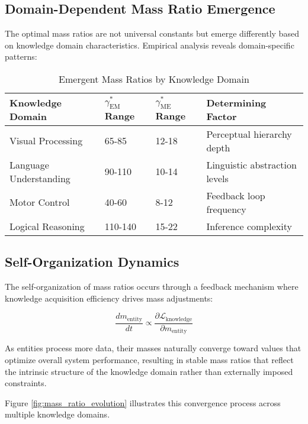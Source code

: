 \subsection{Domain-Dependent Mass Ratio Emergence}

The optimal mass ratios are not universal constants but emerge differently based on knowledge domain characteristics. Empirical analysis reveals domain-specific patterns:

\begin{table}[h]
\centering
\caption{Emergent Mass Ratios by Knowledge Domain}
\label{tab:emergent_mass_ratios}
\begin{tabular}{p{3cm} p{3cm} p{3cm} p{4cm}}
\textbf{Knowledge Domain} & \textbf{$\gamma_{\text{EM}}^*$ Range} & \textbf{$\gamma_{\text{ME}}^*$ Range} & \textbf{Determining Factor} \\
\hline
Visual Processing & 65-85 & 12-18 & Perceptual hierarchy depth \\
Language Understanding & 90-110 & 10-14 & Linguistic abstraction levels \\
Motor Control & 40-60 & 8-12 & Feedback loop frequency \\
Logical Reasoning & 110-140 & 15-22 & Inference complexity \\
\hline
\end{tabular}
\end{table}

\subsection{Self-Organization Dynamics}

The self-organization of mass ratios occurs through a feedback mechanism where knowledge acquisition efficiency drives mass adjustments:

\begin{equation}
\frac{dm_{\text{entity}}}{dt} \propto \frac{\partial \mathcal{L}_{\text{knowledge}}}{\partial m_{\text{entity}}}
\end{equation}

As entities process more data, their masses naturally converge toward values that optimize overall system performance, resulting in stable mass ratios that reflect the intrinsic structure of the knowledge domain rather than externally imposed constraints.

Figure \ref{fig:mass_ratio_evolution} illustrates this convergence process across multiple knowledge domains.

